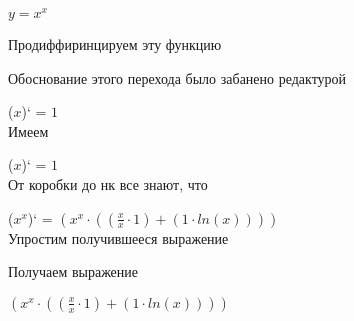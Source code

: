 \documentclass[12pt,a4paper,fleqn]{article}
\begin{document}
$y = $$x^{x}$

 Продиффиринцируем эту функцию

Обоснование этого перехода было забанено редактурой

($x$)` = $1$\\
Имеем

($x$)` = $1$\\
От коробки до нк все знают, что

($x^{x}$)` = $(x^{x} \cdot ((\frac{x}{x} \cdot 1) + (1 \cdot ln(x))))$\\


Упростим получившееся выражение



 Получаем выражение

$(x^{x} \cdot ((\frac{x}{x} \cdot 1) + (1 \cdot ln(x))))$
\end{document}
